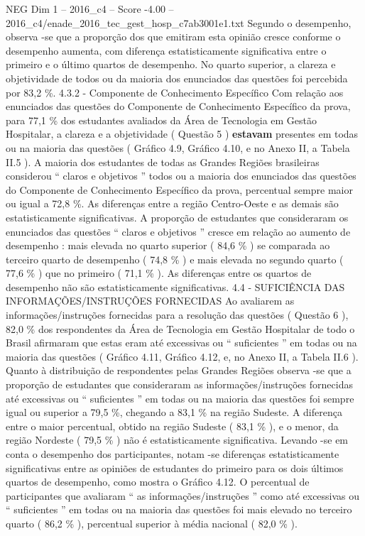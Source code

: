 \begin{textsample}{NEG Dim 1 – 2016\_c4 – Score -4.00 – 2016\_c4/enade\_2016\_tec\_gest\_hosp\_c7ab3001e1.txt}
Segundo o desempenho, observa -se que a proporção dos que emitiram esta opinião cresce conforme o desempenho aumenta, com diferença estatisticamente significativa entre o primeiro e o último quartos de desempenho.
No quarto superior, a clareza e objetividade de todos ou da maioria dos enunciados das questões foi percebida por 83,2 \%. 4.3.2 - Componente de Conhecimento Específico Com relação aos enunciados das questões do Componente de Conhecimento Específico da prova, para 77,1 \% dos estudantes avaliados da Área de Tecnologia em Gestão Hospitalar, a clareza e a objetividade ( Questão 5 ) \textbf{estavam} presentes em todas ou na maioria das questões ( Gráfico 4.9, Gráfico 4.10, e no Anexo II, a Tabela II.5 ).
A maioria dos estudantes de todas as Grandes Regiões brasileiras considerou “ claros e objetivos ” todos ou a maioria dos enunciados das questões do Componente de Conhecimento Específico da prova, percentual sempre maior ou igual a 72,8 \%.
As diferenças entre a região Centro-Oeste e as demais são estatisticamente significativas.
A proporção de estudantes que consideraram os enunciados das questões “ claros e objetivos ” cresce em relação ao aumento de desempenho : mais elevada no quarto superior ( 84,6 \% ) se comparada ao terceiro quarto de desempenho ( 74,8 \% ) e mais elevada no segundo quarto ( 77,6 \% ) que no primeiro ( 71,1 \% ).
As diferenças entre os quartos de desempenho não são estatisticamente significativas. 4.4 - SUFICIÊNCIA DAS INFORMAÇÕES/INSTRUÇÕES FORNECIDAS Ao avaliarem as informações/instruções fornecidas para a resolução das questões ( Questão 6 ), 82,0 \% dos respondentes da Área de Tecnologia em Gestão Hospitalar de todo o Brasil afirmaram que estas eram até excessivas ou “ suficientes ” em todas ou na maioria das questões ( Gráfico 4.11, Gráfico 4.12, e, no Anexo II, a Tabela II.6 ).
Quanto à distribuição de respondentes pelas Grandes Regiões observa -se que a proporção de estudantes que consideraram as informações/instruções fornecidas até excessivas ou “ suficientes ” em todas ou na maioria das questões foi sempre igual ou superior a 79,5 \%, chegando a 83,1 \% na região Sudeste.
A diferença entre o maior percentual, obtido na região Sudeste ( 83,1 \% ), e o menor, da região Nordeste ( 79,5 \% ) não é estatisticamente significativa.
Levando -se em conta o desempenho dos participantes, notam -se diferenças estatisticamente significativas entre as opiniões de estudantes do primeiro para os dois últimos quartos de desempenho, como mostra o Gráfico 4.12.
O percentual de participantes que avaliaram “ as informações/instruções ” como até excessivas ou “ suficientes ” em todas ou na maioria das questões foi mais elevado no terceiro quarto ( 86,2 \% ), percentual superior à média nacional ( 82,0 \% ).

\end{textsample}
